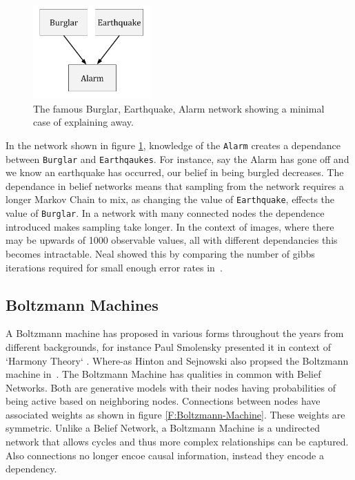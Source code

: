     \begin{figure}[h]
    \begin{center}
      \includegraphics[width = 0.4\textwidth]{Assets/Explaining_Away.png}
    \caption{The famous Burglar, Earthquake, Alarm network showing a minimal case of explaining away.}
    \label{F:Explaining-Away}
    \end{center}
    \end{figure}


    In the network shown in figure \ref{F:Explaining-Away}, knowledge of the \texttt{Alarm} creates a dependance between \texttt{Burglar} and \texttt{Earthqaukes}. For instance, say the Alarm has gone off and we know an earthquake has occurred, our belief in being burgled decreases. The dependance in belief networks means that sampling from the network requires a longer Markov Chain to mix, as changing the value of \texttt{Earthquake}, effects the value of \texttt{Burglar}. In a network with many connected nodes the dependence introduced makes sampling take longer. In the context of images, where there may be upwards of 1000 observable values, all with different dependancies this becomes intractable. Neal showed this by comparing the number of gibbs iterations required for small enough error rates in~\cite{neal1992:connectionist}.

  \subsection{Boltzmann Machines}

A Boltzmann machine has proposed in various forms throughout the years from different backgrounds, for instance Paul Smolensky presented it in context of  `Harmony Theory` \cite{Smolensky:1986vy}. Where-as Hinton and Sejnowski also propsed the Boltzmann machine in~\cite{geoffreye.hintonterrencej.sejnowski1983}. The Boltzmann Machine has qualities in common with Belief Networks. Both are generative models with their nodes having probabilities of being active based on neighboring nodes. Connections between nodes have associated weights as shown in figure \ref{F:Boltzmann-Machine}. These weights are symmetric.
Unlike a Belief Network, a Boltzmann Machine is a undirected network that allows cycles and thus more complex relationships can be captured. Also connections no longer encoe causal information, instead they encode a dependency.


